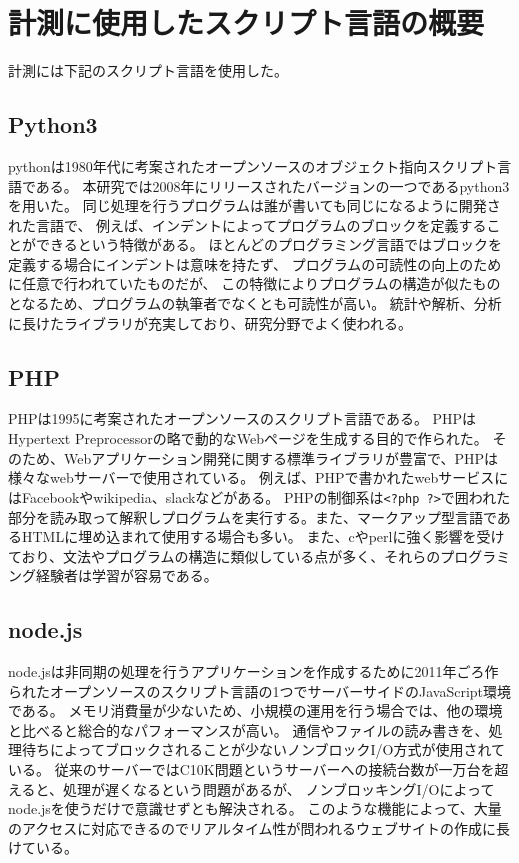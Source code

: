 \chapter{計測に使用したスクリプト言語の概要}
\label{cha:script-language}
計測には下記のスクリプト言語を使用した。
\section{Python3}
pythonは1980年代に考案されたオープンソースのオブジェクト指向スクリプト言語である。
本研究では2008年にリリースされたバージョンの一つであるpython3を用いた。
同じ処理を行うプログラムは誰が書いても同じになるように開発された言語で、
例えば、インデントによってプログラムのブロックを定義することができるという特徴がある。
ほとんどのプログラミング言語ではブロックを定義する場合にインデントは意味を持たず、
プログラムの可読性の向上のために任意で行われていたものだが、
この特徴によりプログラムの構造が似たものとなるため、プログラムの執筆者でなくとも可読性が高い。
統計や解析、分析に長けたライブラリが充実しており、研究分野でよく使われる。

\section{PHP}
PHPは1995に考案されたオープンソースのスクリプト言語である。
PHPはHypertext Preprocessorの略で動的なWebページを生成する目的で作られた。
そのため、Webアプリケーション開発に関する標準ライブラリが豊富で、PHPは様々なwebサーバーで使用されている。
例えば、PHPで書かれたwebサービスにはFacebookやwikipedia、slackなどがある。
PHPの制御系は\verb|<?php ?>|で囲われた部分を読み取って解釈しプログラムを実行する。また、マークアップ型言語であるHTMLに埋め込まれて使用する場合も多い。
また、cやperlに強く影響を受けており、文法やプログラムの構造に類似している点が多く、それらのプログラミング経験者は学習が容易である。

\section{node.js}
node.jsは非同期の処理を行うアプリケーションを作成するために2011年ごろ作られたオープンソースのスクリプト言語の1つでサーバーサイドのJavaScript環境である。
メモリ消費量が少ないため、小規模の運用を行う場合では、他の環境と比べると総合的なパフォーマンスが高い。
通信やファイルの読み書きを、処理待ちによってブロックされることが少ないノンブロックI/O方式が使用されている。
従来のサーバーではC10K問題というサーバーへの接続台数が一万台を超えると、処理が遅くなるという問題があるが、
ノンブロッキングI/Oによってnode.jsを使うだけで意識せずとも解決される。
このような機能によって、大量のアクセスに対応できるのでリアルタイム性が問われるウェブサイトの作成に長けている。

